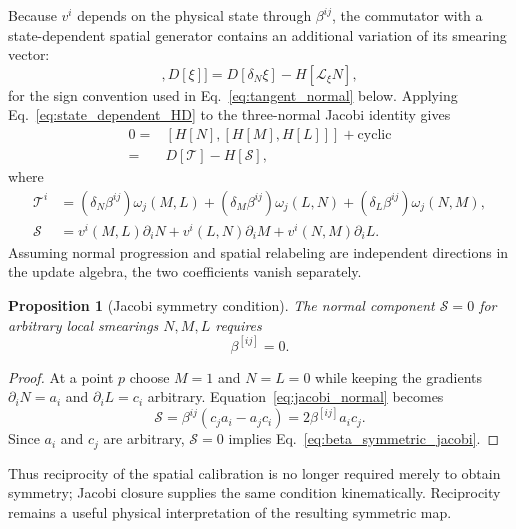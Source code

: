 \documentclass[11pt]{article}
\newtheorem{proposition}{Proposition}
\begin{document}
Because $v^i$ depends on the physical state through $\beta^{ij}$, the commutator with a state-dependent spatial generator contains an additional variation of its smearing vector:
\begin{equation}
    [H[N],D[\xi]]
    =D[\delta_N\xi]-H[\mathcal L_\xi N],
    \label{eq:state_dependent_HD}
\end{equation}
for the sign convention used in Eq.~\eqref{eq:tangent_normal} below. Applying Eq.~\eqref{eq:state_dependent_HD} to the three-normal Jacobi identity gives
\begin{equation}
\begin{split}
0={}&[H[N],[H[M],H[L]]]+\text{cyclic}\\
={}&D[\mathcal T]-H[\mathcal S],
\end{split}
\label{eq:three_normal_jacobi_split}
\end{equation}
where
\begin{align}
    \mathcal T^i
    &=(\delta_N\beta^{ij})\omega_j(M,L)
      +(\delta_M\beta^{ij})\omega_j(L,N)
      +(\delta_L\beta^{ij})\omega_j(N,M),
    \label{eq:jacobi_tangential}\\
    \mathcal S
    &=v^i(M,L)\partial_iN
      +v^i(L,N)\partial_iM
      +v^i(N,M)\partial_iL.
    \label{eq:jacobi_normal}
\end{align}
Assuming normal progression and spatial relabeling are independent directions in the update algebra, the two coefficients vanish separately.

\begin{proposition}[Jacobi symmetry condition]
The normal component $\mathcal S=0$ for arbitrary local smearings $N,M,L$ requires
\begin{equation}
    \boxed{\beta^{[ij]}=0.}
    \label{eq:beta_symmetric_jacobi}
\end{equation}
\end{proposition}

\begin{proof}
At a point $p$ choose $M=1$ and $N=L=0$ while keeping the gradients $\partial_iN=a_i$ and $\partial_iL=c_i$ arbitrary. Equation~\eqref{eq:jacobi_normal} becomes
\begin{equation}
    \mathcal S
    =\beta^{ij}(c_j a_i-a_j c_i)
    =2\beta^{[ij]}a_i c_j.
\end{equation}
Since $a_i$ and $c_j$ are arbitrary, $\mathcal S=0$ implies Eq.~\eqref{eq:beta_symmetric_jacobi}.
\end{proof}

Thus reciprocity of the spatial calibration is no longer required merely to obtain symmetry; Jacobi closure supplies the same condition kinematically. Reciprocity remains a useful physical interpretation of the resulting symmetric map.
\end{document}
